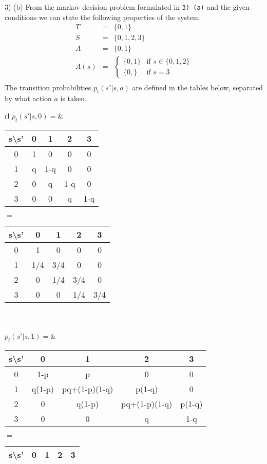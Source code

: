 \documentclass[11pt,a4paper]{article}
\begin{document}
\begin{answer}{3) (b)}
  From the markov decision problem formulated in \texttt{3) (a)} and the given conditions we can state the following properties of the system
  \[\begin{array}{rcl}
    T&=&\{0,1\}\\
    S&=&\{0,1,2,3\}\\
    A&=&\{0,1\}\\
    A(s)&=&\begin{cases}
             \{0,1\}&\text{if }s\in\{0,1,2\}\\
             \{0,\}&\text{if }s=3
           \end{cases}\\
  \end{array}\]
  The transition probabilities $p_t(s'|s,a)$ are defined in the tables below, separated by what action $a$ is taken.
  \begin{adjustwidth}{-2cm}{}
    \begin{tabular}{rl}
      $p_t(s'|s,0)=$&\begin{tabular}{c|cccc}
      s\textbackslash s'&0&1&2&3\\\hline
      0&1&0&0&0\\
      1&q&1-q&0&0&\\
      2&0&q&1-q&0&\\
      3&0&0&q&1-q
      \end{tabular}$=$
      \begin{tabular}{c|cccc}
        s\textbackslash s'&0&1&2&3\\\hline
        0&1&0&0&0\\
        1&1/4&3/4&0&0&\\
        2&0&1/4&3/4&0&\\
        3&0&0&1/4&3/4
      \end{tabular}\\\\
      $p_t(s'|s,1)=$&\begin{tabular}{c|cccc}
      s\textbackslash s'&0&1&2&3\\\hline
      0&1-p&p&0&0\\
      1&q(1-p)&pq+(1-p)(1-q)&p(1-q)&0&\\
      2&0&q(1-p)&pq+(1-p)(1-q)&p(1-q)&\\
      3&0&0&q&1-q
      \end{tabular}$=$
      \begin{tabular}{c|cccc}
        s\textbackslash s'&0&1&2&3\\\hline

\end{tabular}
\end{tabular}
\end{adjustwidth}
\end{answer}
\end{document}
